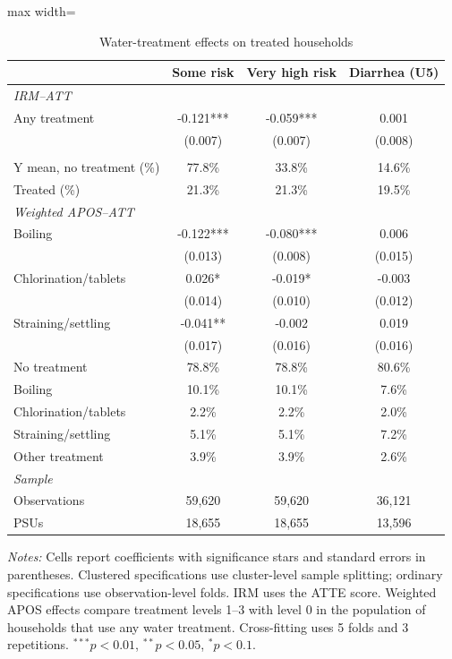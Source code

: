 \begin{table}[htbp]
\centering
\caption{Water-treatment effects on treated households}
\label{tab:water-treatment-main}
\scriptsize
\setlength{\tabcolsep}{4pt}
\renewcommand{\arraystretch}{0.92}
\begin{adjustbox}{max width=\linewidth}
\begin{tabular}{lccc}
\hline\hline
 & Some risk & Very high risk & Diarrhea (U5) \\
\hline
\multicolumn{4}{l}{\textit{IRM--ATT}} \\
Any treatment & -0.121*** & -0.059*** & 0.001 \\
 & (0.007) & (0.007) & (0.008) \\
\addlinespace[6pt]
\multicolumn{4}{l}{\textit{Descriptive statistics}} \\
Y mean, no treatment (\%) & 77.8\% & 33.8\% & 14.6\% \\
Treated (\%) & 21.3\% & 21.3\% & 19.5\% \\
\midrule
\multicolumn{4}{l}{\textit{Weighted APOS--ATT}} \\
Boiling & -0.122*** & -0.080*** & 0.006 \\
 & (0.013) & (0.008) & (0.015) \\
Chlorination/tablets & 0.026* & -0.019* & -0.003 \\
 & (0.014) & (0.010) & (0.012) \\
Straining/settling & -0.041** & -0.002 & 0.019 \\
 & (0.017) & (0.016) & (0.016) \\
\addlinespace[6pt]
No treatment & 78.8\% & 78.8\% & 80.6\% \\
Boiling & 10.1\% & 10.1\% & 7.6\% \\
Chlorination/tablets & 2.2\% & 2.2\% & 2.0\% \\
Straining/settling & 5.1\% & 5.1\% & 7.2\% \\
Other treatment & 3.9\% & 3.9\% & 2.6\% \\
\midrule
\multicolumn{4}{l}{\textit{Sample}} \\
Observations & 59,620 & 59,620 & 36,121 \\
PSUs & 18,655 & 18,655 & 13,596 \\
\hline\hline
\end{tabular}
\end{adjustbox}
\par\vspace{3pt}
\begin{minipage}{\linewidth}\scriptsize \textit{Notes:} Cells report coefficients with significance stars and standard errors in parentheses. Clustered specifications use cluster-level sample splitting; ordinary specifications use observation-level folds. IRM uses the ATTE score. Weighted APOS effects compare treatment levels 1--3 with level 0 in the population of households that use any water treatment. Cross-fitting uses 5 folds and 3 repetitions. $^{***}p<0.01$, $^{**}p<0.05$, $^{*}p<0.1$.\end{minipage}
\end{table}